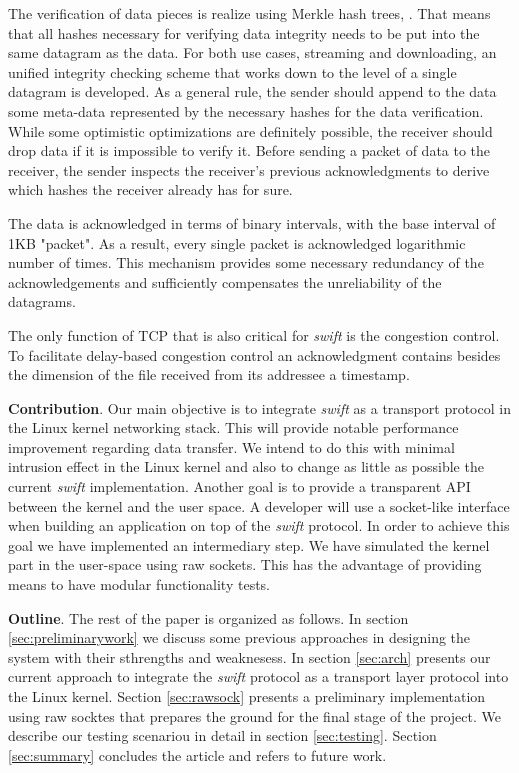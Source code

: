 The verification of data pieces is realize using Merkle hash trees\cite{merkle}, \cite{merkle-ext}. That means that all
hashes necessary for verifying data integrity needs to be put into the same datagram as the data. For both use cases,
streaming and downloading, an unified  integrity checking scheme that works down to the level of a single datagram is
developed. As a general rule, the sender should append to the data some meta-data represented by the necessary hashes
for the data verification. While some optimistic optimizations are definitely possible, the receiver should drop data if
it is impossible to verify it. Before sending a packet of data to the receiver, the sender inspects the receiver's
previous acknowledgments to derive which hashes the receiver already has for sure. 

The data is acknowledged in terms of binary intervals, with the base interval of 1KB "packet". As a result, every 
single packet is acknowledged logarithmic number of times. This mechanism provides some necessary redundancy of the
acknowledgements and sufficiently compensates the unreliability of the datagrams. 

The only function of TCP that is also critical for \emph{swift} is the congestion control. To facilitate delay-based 
congestion control an acknowledgment contains besides the dimension of the file received from its addressee a timestamp.


\textbf{Contribution}. Our main objective is to integrate \emph{swift} as a transport protocol in the Linux kernel 
networking stack. This will provide notable performance improvement regarding data transfer. We intend to do this with 
minimal intrusion effect in the Linux kernel and also to change as little as possible the current \emph{swift} 
implementation. Another goal is to provide a transparent API between the kernel and the user space. A developer will use 
a socket-like interface when building an application on top of the \emph{swift} protocol. In order to achieve this goal
we have implemented an intermediary step. We have simulated the kernel part in the user-space using raw sockets. This 
has the advantage of providing means to have modular functionality tests.


\textbf{Outline}. The rest of the paper is organized as follows. In section \ref{sec:preliminarywork} we discuss some
previous approaches in designing the system with their sthrengths and weaknesess. In section \ref{sec:arch}
 presents our current approach to integrate the \emph{swift} protocol as a transport layer protocol into the Linux
kernel. Section \ref{sec:rawsock} presents a preliminary implementation using raw socktes that prepares the ground for
the final stage of the project.  We describe our testing scenariou in detail in section \ref{sec:testing}. Section
\ref{sec:summary} concludes the article and refers to future work.
